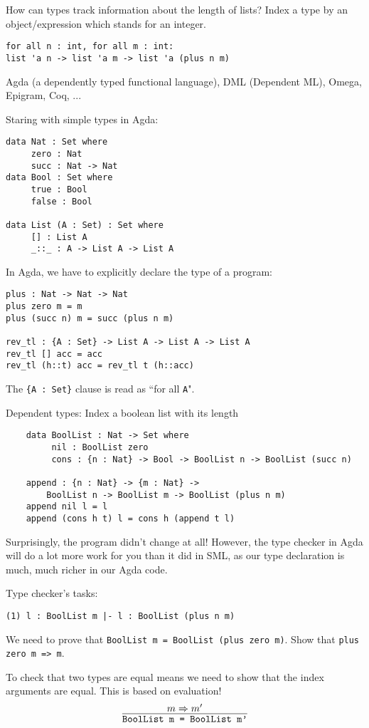 \documentclass[11pt]{article}
\begin{document}
How can types track information about the length of lists? Index a type by an object/expression which stands for an integer. 
\begin{verbatim}
for all n : int, for all m : int:
list 'a n -> list 'a m -> list 'a (plus n m)
\end{verbatim}

Agda (a dependently typed functional language), DML (Dependent ML), Omega, Epigram, Coq, ...

Staring with simple types in Agda:
\begin{verbatim}
data Nat : Set where
     zero : Nat
     succ : Nat -> Nat
data Bool : Set where
     true : Bool
     false : Bool

data List (A : Set) : Set where
     [] : List A
     _::_ : A -> List A -> List A
\end{verbatim}

In Agda, we have to explicitly declare the type of a program:
\begin{verbatim}
plus : Nat -> Nat -> Nat
plus zero m = m
plus (succ n) m = succ (plus n m)

rev_tl : {A : Set} -> List A -> List A -> List A
rev_tl [] acc = acc
rev_tl (h::t) acc = rev_tl t (h::acc)
\end{verbatim}

The \verb~{A : Set}~ clause is read as ``for all \verb~A~".

Dependent types:
Index a boolean list with its length
\begin{verbatim}
    data BoolList : Nat -> Set where
         nil : BoolList zero
         cons : {n : Nat} -> Bool -> BoolList n -> BoolList (succ n)
    
    append : {n : Nat} -> {m : Nat} -> 
        BoolList n -> BoolList m -> BoolList (plus n m)
    append nil l = l
    append (cons h t) l = cons h (append t l)
\end{verbatim} 
Surprisingly, the program didn't change at all! However, the type checker in Agda will do a lot more work for you than it did in SML, as our type declaration is much, much richer in our Agda code.

Type checker's tasks:
\begin{verbatim}
(1) l : BoolList m |- l : BoolList (plus n m)
\end{verbatim}
We need to prove that \verb~BoolList m = BoolList (plus zero m)~. Show that \verb~plus zero m => m~.

To check that two types are equal means we need to show that the index arguments are equal. This is based on evaluation!
\[
    \infer{\verb~BoolList m = BoolList m'~}{ m \Rightarrow m^{\prime}}
\]
\end{document}
